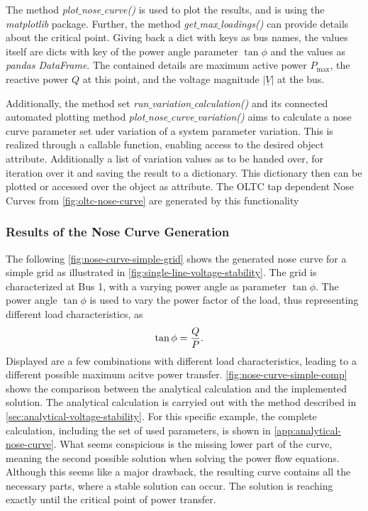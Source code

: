 The method {\itshape plot$\_$nose$\_$curve()} is used to plot the results, and is using the {\itshape matplotlib} package.
Further, the method {\itshape get$\_$max$\_$loadings()} can provide details about the critical point.
Giving back a dict with keys as bus names, the values itself are dicts with key of the power angle parameter $\tan \phi$ and the values as {\itshape pandas DataFrame}.
The contained details are maximum active power $P_\mathrm{max}$, the reactive power $Q$ at this point, and the voltage magnitude $\vert \underline{V} \vert$ at the bus.

Additionally, the method set \textit{run$\_$variation$\_$calculation()} and its connected automated plotting method \textit{plot$\_$nose$\_$curve$\_$variation()} aims to calculate a nose curve parameter set uder variation of a system parameter variation.
This is realized through a callable function, enabling access to the desired object attribute.
Additionally a list of variation values as to be handed over, for iteration over it and saving the result to a dictionary.
This dictionary then can be plotted or accessed over the object as attribute.
The \acs{OLTC} tap dependent Nose Curves from \autoref{fig:oltc-nose-curve} are generated by this functionality

\subsubsection{Results of the Nose Curve Generation}

The following \autoref{fig:nose-curve-simple-grid} shows the generated nose curve for a simple grid as illustrated in \autoref{fig:single-line-voltage-stability}.
The grid is characterized at Bus 1, with a varying power angle as parameter $\tan \phi$.
The power angle $\tan \phi$ is used to vary the power factor of the load, thus representing different load characteristics, as
\begin{align}
        \tan \phi &= \frac{Q}{P}. \notag %
\end{align}
Displayed are a few combinations with different load characteristics, leading to a different possible maximum acitve power transfer.
\autoref{fig:nose-curve-simple-comp} shows the comparison between the analytical calculation and the implemented solution.
The analytical calculation is carryied out with the method described in \autoref{sec:analytical-voltage-stability}.
For this specific example, the complete calculation, including the set of used parameters, is shown in \autoref{app:analytical-nose-curve}.
What seems conspicious is the missing lower part of the curve, meaning the second possible solution when solving the power flow equations.
Although this seems like a major drawback, the resulting curve contains all the necessary parts, where a stable solution can occur. \quelle
The solution is reaching exactly until the critical point of power transfer.


